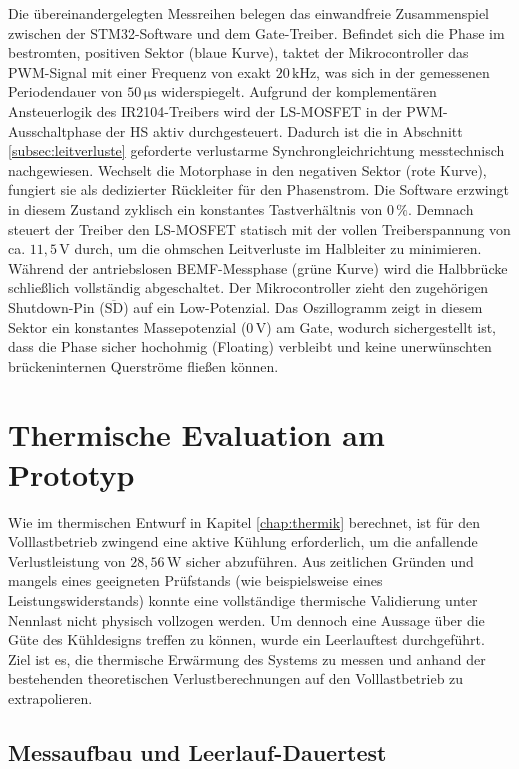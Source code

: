 Die übereinandergelegten Messreihen belegen das einwandfreie Zusammenspiel zwischen der STM32-Software und dem Gate-Treiber. Befindet sich die Phase im bestromten, positiven Sektor (blaue Kurve), taktet der Mikrocontroller das PWM-Signal mit einer Frequenz von exakt $20\,\mathrm{kHz}$, was sich in der gemessenen Periodendauer von $50\,\mathrm{\mu s}$ widerspiegelt. Aufgrund der komplementären Ansteuerlogik des IR2104-Treibers wird der LS-MOSFET in der PWM-Ausschaltphase der HS aktiv durchgesteuert. Dadurch ist die in Abschnitt \ref{subsec:leitverluste} geforderte verlustarme Synchrongleichrichtung messtechnisch nachgewiesen.
Wechselt die Motorphase in den negativen Sektor (rote Kurve), fungiert sie als dedizierter Rückleiter für den Phasenstrom. Die Software erzwingt in diesem Zustand zyklisch ein konstantes Tastverhältnis von $0\,\%$. Demnach steuert der Treiber den LS-MOSFET statisch mit der vollen Treiberspannung von ca. $11{,}5\,\mathrm{V}$ durch, um die ohmschen Leitverluste im Halbleiter zu minimieren.
Während der antriebslosen BEMF-Messphase (grüne Kurve) wird die Halbbrücke schließlich vollständig abgeschaltet. Der Mikrocontroller zieht den zugehörigen Shutdown-Pin ($\overline{\mathrm{SD}}$) auf ein Low-Potenzial. Das Oszillogramm zeigt in diesem Sektor ein konstantes Massepotenzial ($0\,\mathrm{V}$) am Gate, wodurch sichergestellt ist, dass die Phase sicher hochohmig (Floating) verbleibt und keine unerwünschten brückeninternen Querströme fließen können.

\section{Thermische Evaluation am Prototyp}
\label{sec:thermik_eval}

Wie im thermischen Entwurf in Kapitel \ref{chap:thermik} berechnet, ist für den Volllastbetrieb zwingend eine aktive Kühlung erforderlich, um die anfallende Verlustleistung von $28{,}56\,\mathrm{W}$ sicher abzuführen. Aus zeitlichen Gründen und mangels eines geeigneten Prüfstands (wie beispielsweise eines Leistungswiderstands) konnte eine vollständige thermische Validierung unter Nennlast nicht physisch vollzogen werden. Um dennoch eine Aussage über die Güte des Kühldesigns treffen zu können, wurde ein Leerlauftest durchgeführt. Ziel ist es, die thermische Erwärmung des Systems zu messen und anhand der bestehenden theoretischen Verlustberechnungen auf den Volllastbetrieb zu extrapolieren.

\subsection{Messaufbau und Leerlauf-Dauertest}

